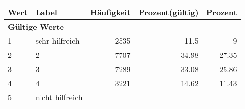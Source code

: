      \begin{longtable}{lXrrr}
     \toprule
     \textbf{Wert} & \textbf{Label} & \textbf{Häufigkeit} & \textbf{Prozent(gültig)} & \textbf{Prozent} \\
     \endhead
     \midrule
     \multicolumn{5}{l}{\textbf{Gültige Werte}}\\

     1 &
     \multicolumn{1}{X}{ sehr hilfreich   } &


       \num{2535} &
       \num[round-mode=places,round-precision=2]{11.5} &
         \num[round-mode=places,round-precision=2]{9} \\

     2 &
     \multicolumn{1}{X}{ 2   } &


       \num{7707} &
       \num[round-mode=places,round-precision=2]{34.98} &
         \num[round-mode=places,round-precision=2]{27.35} \\

     3 &
     \multicolumn{1}{X}{ 3   } &


       \num{7289} &
       \num[round-mode=places,round-precision=2]{33.08} &
         \num[round-mode=places,round-precision=2]{25.86} \\

     4 &
     \multicolumn{1}{X}{ 4   } &


       \num{3221} &
       \num[round-mode=places,round-precision=2]{14.62} &
         \num[round-mode=places,round-precision=2]{11.43} \\

     5 &
     \multicolumn{1}{X}{ nicht hilfreich   } &



\end{longtable}
